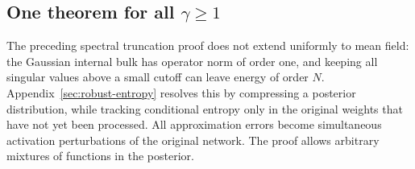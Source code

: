 \documentclass[11pt]{article}
\begin{document}
\subsection{One theorem for all \texorpdfstring{$\gamma\ge1$}{gamma at least one}}
\label{sec:unified}

The preceding spectral truncation proof does not extend uniformly to mean
field: the Gaussian internal bulk has operator norm of order one, and keeping
all singular values above a small cutoff can leave energy of order $N$.
Appendix~\ref{sec:robust-entropy} resolves this by compressing a posterior
distribution, while tracking conditional entropy only in the original weights
that have not yet been processed. All approximation errors become simultaneous
activation perturbations of the original network. The proof allows arbitrary
mixtures of functions in the posterior.
\end{document}
